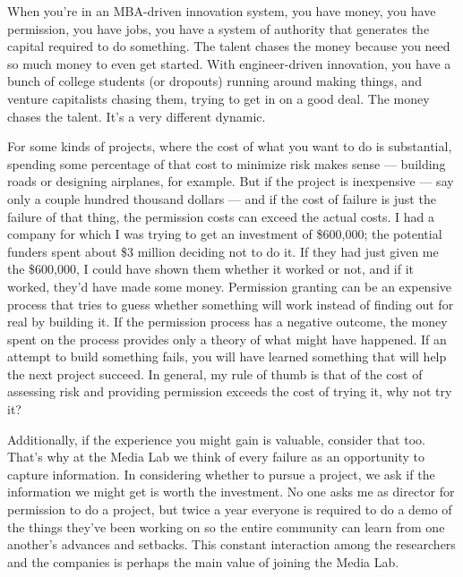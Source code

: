 When you're in an \ac{MBA}-driven innovation system, you have money, you have permission, you have jobs, you have a system of authority that generates the capital required to do something. The talent chases the money because you need so much money to even get started. With engineer-driven innovation, you have a bunch of college students (or dropouts) running around making things, and venture capitalists chasing them, trying to get in on a good deal. The money chases the talent. It's a very different dynamic.

For some kinds of projects, where the cost of what you want to do is substantial, spending some percentage of that cost to minimize risk makes sense --- building roads or designing airplanes, for example. But if the project is inexpensive --- say only a couple hundred thousand dollars --- and if the cost of failure is just the failure of that thing, the permission costs can exceed the actual costs. I had a company for which I was trying to get an investment of \$600,000; the potential funders spent about \$3 million deciding not to do it. If they had just given me the \$600,000, I could have shown them whether it worked or not, and if it worked, they'd have made some money. Permission granting can be an expensive process that tries to guess whether something will work instead of finding out for real by building it. If the permission process has a negative outcome, the money spent on the process provides only a theory of what might have happened. If an attempt to build something fails, you will have learned something that will help the next project succeed. In general, my rule of thumb is that of the cost of assessing risk and providing permission exceeds the cost of trying it, why not try it? 

Additionally, if the experience you might gain is valuable, consider that too. That's why at the Media Lab we think of every failure as an opportunity to capture information. In considering whether to pursue a project, we ask if the information we might get is worth the investment. No one asks me as director for permission to do a project, but twice a year everyone is required to do a demo of the things they've been working on so the entire community can learn from one another's advances and setbacks. This constant interaction among the researchers and the companies is perhaps the main value of joining the Media Lab.

